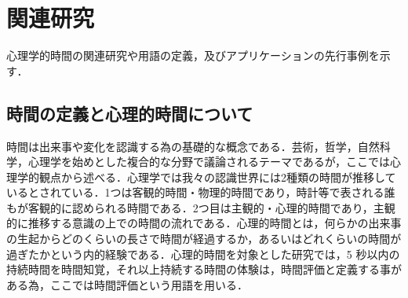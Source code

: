 \chapter{関連研究}
心理学的時間の関連研究や用語の定義，及びアプリケーションの先行事例を示す．

\section{時間の定義と心理的時間について}
時間は出来事や変化を認識する為の基礎的な概念である．芸術，哲学，自然科学，心理学を始めとした複合的な分野で議論されるテーマであるが，ここでは心理学的観点から述べる．心理学では我々の認識世界には2種類の時間が推移しているとされている．1つは客観的時間・物理的時間であり，時計等で表される誰もが客観的に認められる時間である．2つ目は主観的・心理的時間であり，主観的に推移する意識の上での時間の流れである．心理的時間とは，何らかの出来事の生起からどのくらいの長さで時間が経過するか，あるいはどれくらいの時間が過ぎたかという内的経験である\cite{Meck2005}．心理的時間を対象とした研究では，5 秒以内の持続時間を時間知覚，それ以上持続する時間の体験は，時間評価と定義する事がある為\cite{加藤2005}，ここでは時間評価という用語を用いる．

